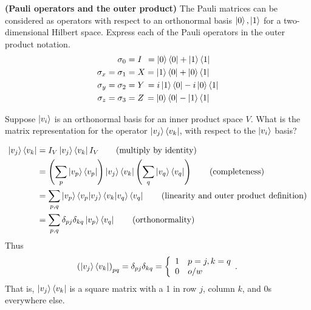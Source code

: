  \textbf{(Pauli operators and the outer product)} The Pauli matrices can be considered as operators with respect to an orthonormal basis $\ket{0}, \ket{1}$ for a two-dimensional Hilbert space.  Express each of the Pauli operators in the outer product notation.
\begin{align*}
	\sigma_0 &= I \hspace{4.5pt}= \ket{0}\bra{0} + \ket{1}\bra{1}\\
	\sigma_x = \sigma_1 &= X = \ket{1}\bra{0} + \ket{0}\bra{1}\\
	\sigma_y = \sigma_2 &= Y \hspace{1.5pt}=  i\ket{1}\bra{0} - i\ket{0}\bra{1}\\
	\sigma_z = \sigma_3 &= Z \hspace{1.5pt}= \ket{0}\bra{0} - \ket{1}\bra{1}
\end{align*}

 Suppose $\ket{v_i}$ is an orthonormal basis for an inner product space $V$.  What is the matrix representation for the operator $\ket{v_j}\bra{v_k}$, with respect to the $\ket{v_i}$ basis?
\Soln \begin{comment} Let $\ket{v}=\sum_i a_i\ket{v_i}$ be a vector in $V$. 
\begin{align*}
	(\ket{v_j}\bra{v_k})(\ket{v}) = (\ket{v_j}\bra{v_k})\left(\sum_i a_i\ket{v_i}\right) &= \sum_i\braket{v_k|v_i}\ket{v_j} \tag{definition}\\
	&= \sum_i\delta_{ki}\ket{v_j}
\end{align*}
\end{comment}
\begin{align*}
	\ket{v_j}\bra{v_k} &= I_V \ket{v_j} \bra{v_k} I_V \tag{multiply by identity}\\
	&= \left(\sum_p \ket{v_p}\bra{v_p} \right) \ket{v_j}\bra{v_k} \left(\sum_q \ket{v_q}\bra{v_q} \right) \tag{completeness}\\
	&= \sum_{p,q} \ket{v_p} \braket{v_p|v_j}\braket{v_k | v_q} \bra{v_q} \tag{linearity and outer product definition}\\
	&= \sum_{p,q} \delta_{pj} \delta_{kq} \ket{v_p} \bra{v_q} \tag{orthonormality}
\end{align*}
Thus
\begin{align*}
	\left( \ket{v_j}\bra{v_k} \right)_{pq} = \delta_{pj} \delta_{kq} = \left\{\begin{array}{ll}1 & p=j, k=q \\ 0 & o/w\end{array}.\right. 
\end{align*}
That is, $\ket{v_j}\bra{v_k}$ is a square matrix with a 1 in row $j$,  column $k$, and 0s everywhere else.

